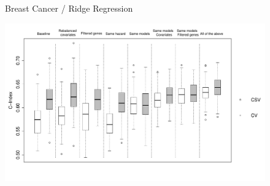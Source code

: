 \documentclass{article}
\begin{document}
  \begin{figure}[H]
		\centering            
        	\centerline{Breast Cancer / Ridge Regression}
            \includegraphics[width=16cm]{boxplot_breast_ridge_allpanels_new.pdf}
   \end{figure}
   
\end{document}
